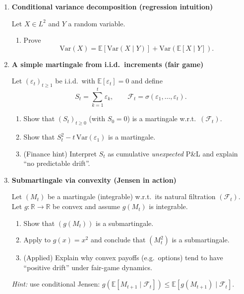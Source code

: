 \documentclass[11pt]{article}
\begin{document}
\begin{enumerate}
\bigskip

\item \textbf{Conditional variance decomposition (regression intuition)}

Let $X\in L^2$ and $Y$ a random variable.
\begin{enumerate}
\item Prove
\[
\mathrm{Var}(X)=\mathbb{E}[\mathrm{Var}(X\mid Y)]+\mathrm{Var}(\mathbb{E}[X\mid Y]).
\]
\end{enumerate}

\bigskip

\item \textbf{A simple martingale from i.i.d.\ increments (fair game)}

Let $(\varepsilon_t)_{t\ge1}$ be i.i.d.\ with $\mathbb{E}[\varepsilon_t]=0$ and define
\[
S_t=\sum_{k=1}^t \varepsilon_k,\qquad \mathcal{F}_t=\sigma(\varepsilon_1,\dots,\varepsilon_t).
\]
\begin{enumerate}
\item Show that $(S_t)_{t\ge0}$ (with $S_0=0$) is a martingale w.r.t.\ $(\mathcal{F}_t)$.
\item Show that $S_t^2-t\,\mathrm{Var}(\varepsilon_1)$ is a martingale.
\item (Finance hint) Interpret $S_t$ as cumulative \emph{unexpected} P\&L and explain ``no predictable drift''.
\end{enumerate}

\bigskip

\item \textbf{Submartingale via convexity (Jensen in action)}

Let $(M_t)$ be a martingale (integrable) w.r.t.\ its natural filtration $(\mathcal{F}_t)$.
Let $g:\mathbb{R}\to\mathbb{R}$ be convex and assume $g(M_t)$ is integrable.
\begin{enumerate}
\item Show that $(g(M_t))$ is a submartingale.
\item Apply to $g(x)=x^2$ and conclude that $(M_t^2)$ is a submartingale.
\item (Applied) Explain why convex payoffs (e.g.\ options) tend to have ``positive drift'' under fair-game dynamics.
\end{enumerate}
\emph{Hint:} use conditional Jensen:
$g(\mathbb{E}[M_{t+1}\mid\mathcal{F}_t])\le \mathbb{E}[g(M_{t+1})\mid\mathcal{F}_t]$.


\end{enumerate}
\end{document}
